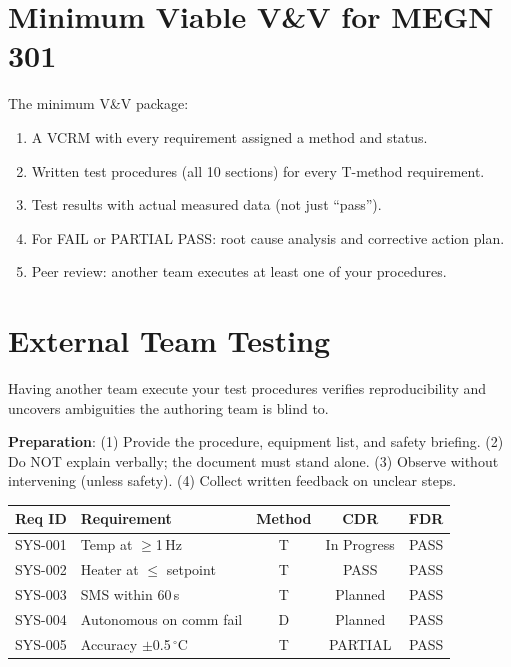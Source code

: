 \documentclass[11pt,letterpaper,twoside,openany]{book}
\newcommand{\degC}{\ensuremath{{}^{\circ}\text{C}}}
\begin{document}
\section{Minimum Viable V\&V for MEGN 301}
The minimum V\&V package:
\begin{enumerate}[nosep,leftmargin=1.5em]
\item A VCRM with every requirement assigned a method and status.
\item Written test procedures (all 10 sections) for every T-method requirement.
\item Test results with actual measured data (not just ``pass'').
\item For FAIL or PARTIAL PASS: root cause analysis and corrective action plan.
\item Peer review: another team executes at least one of your procedures.
\end{enumerate}

\section{External Team Testing}
Having another team execute your test procedures verifies reproducibility and uncovers ambiguities the authoring team is blind to.

\textbf{Preparation}: (1) Provide the procedure, equipment list, and safety briefing. (2) Do NOT explain verbally; the document must stand alone. (3) Observe without intervening (unless safety). (4) Collect written feedback on unclear steps.

\begin{greenshieldbox}
\small
\begin{tabularx}{\textwidth}{l l c c c}
\toprule
\textbf{Req ID} & \textbf{Requirement} & \textbf{Method} & \textbf{CDR} & \textbf{FDR} \\
\midrule
SYS-001 & Temp at $\geq$1\,Hz & T & In Progress & PASS \\
SYS-002 & Heater at $\leq$ setpoint & T & PASS & PASS \\
SYS-003 & SMS within 60\,s & T & Planned & PASS \\
SYS-004 & Autonomous on comm fail & D & Planned & PASS \\
SYS-005 & Accuracy $\pm$0.5\,\degC{} & T & PARTIAL & PASS \\
\bottomrule
\end{tabularx}
\end{greenshieldbox}
\end{document}

